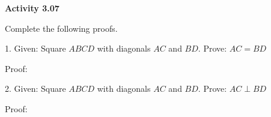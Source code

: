 \vspace{0.3ex}
\noindent\textbf{Activity 3.07}

\vspace{0.2ex}


\noindent Complete the following proofs.

\noindent \begin{minipage}[c]{0.35\textwidth}
1. Given: Square \( ABCD \) with diagonals \( AC \) and \( BD \).
Prove: \( AC = BD \)
\end{minipage}
\begin{minipage}[c]{0.14\textwidth}

\end{minipage}
\noindent Proof:

\vspace{-.1ex}
\noindent \begin{minipage}[c]{0.49\textwidth}
  
\end{minipage}

\noindent \begin{minipage}[c]{0.35\textwidth}
2. Given: Square \( ABCD \) with diagonals \( AC \) and \( BD \).
Prove: \( AC \perp BD \)
\end{minipage}
\begin{minipage}[c]{0.14\textwidth}

\end{minipage}
\noindent Proof:

\vspace{-.1ex}
\noindent \begin{minipage}[c]{0.49\textwidth}
  
\end{minipage}

